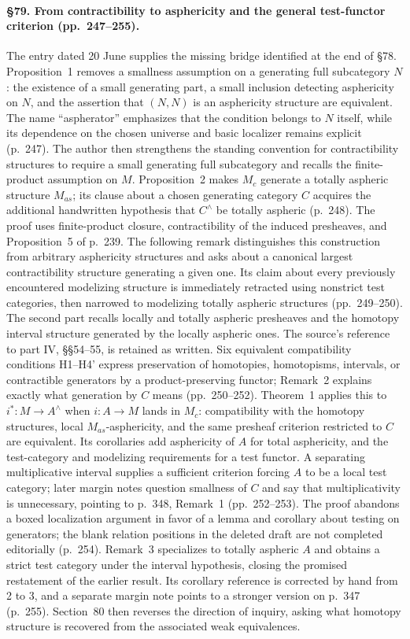 \paragraph{\S79. From contractibility to asphericity and the general test-functor criterion (pp.\ 247--255).}
The entry dated 20 June supplies the missing bridge identified at the end of \S78. Proposition~1 removes a smallness assumption on a generating full subcategory $N$: the existence of a small generating part, a small inclusion detecting asphericity on $N$, and the assertion that $(N,N)$ is an asphericity structure are equivalent. The name “aspherator” emphasizes that the condition belongs to $N$ itself, while its dependence on the chosen universe and basic localizer remains explicit (p.\ 247). The author then strengthens the standing convention for contractibility structures to require a small generating full subcategory and recalls the finite-product assumption on $M$. Proposition~2 makes $M_c$ generate a totally aspheric structure $M_{as}$; its clause about a chosen generating category $C$ acquires the additional handwritten hypothesis that $C^\wedge$ be totally aspheric (p.\ 248). The proof uses finite-product closure, contractibility of the induced presheaves, and Proposition~5 of p.\ 239. The following remark distinguishes this construction from arbitrary asphericity structures and asks about a canonical largest contractibility structure generating a given one. Its claim about every previously encountered modelizing structure is immediately retracted using nonstrict test categories, then narrowed to modelizing totally aspheric structures (pp.\ 249--250). The second part recalls locally and totally aspheric presheaves and the homotopy interval structure generated by the locally aspheric ones. The source's reference to part IV, \S\S54--55, is retained as written. Six equivalent compatibility conditions H1--H4' express preservation of homotopies, homotopisms, intervals, or contractible generators by a product-preserving functor; Remark~2 explains exactly what generation by $C$ means (pp.\ 250--252). Theorem~1 applies this to $i^*:M\to A^\wedge$ when $i:A\to M$ lands in $M_c$: compatibility with the homotopy structures, local $M_{as}$-asphericity, and the same presheaf criterion restricted to $C$ are equivalent. Its corollaries add asphericity of $A$ for total asphericity, and the test-category and modelizing requirements for a test functor. A separating multiplicative interval supplies a sufficient criterion forcing $A$ to be a local test category; later margin notes question smallness of $C$ and say that multiplicativity is unnecessary, pointing to p.\ 348, Remark~1 (pp.\ 252--253). The proof abandons a boxed localization argument in favor of a lemma and corollary about testing on generators; the blank relation positions in the deleted draft are not completed editorially (p.\ 254). Remark~3 specializes to totally aspheric $A$ and obtains a strict test category under the interval hypothesis, closing the promised restatement of the earlier result. Its corollary reference is corrected by hand from 2 to 3, and a separate margin note points to a stronger version on p.\ 347 (p.\ 255). Section~80 then reverses the direction of inquiry, asking what homotopy structure is recovered from the associated weak equivalences.

